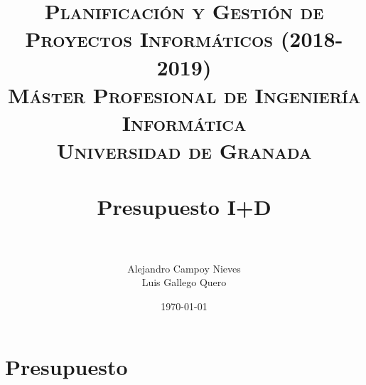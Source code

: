


\title{	
	\normalfont \normalsize 
	\textsc{\textbf{Planificación y Gestión de Proyectos Informáticos (2018-2019)} \\ Máster Profesional de Ingeniería Informática \\ Universidad de Granada} \\ [25pt] %
	\horrule{0.5pt} \\[0.4cm] %
	\huge Presupuesto I+D \\ %
	\horrule{2pt} \\[0.5cm] %
}

\author{Alejandro Campoy Nieves \\ Luis Gallego Quero} %
\date{\normalsize\today} %

\usepackage[spanish, es-tabla]{babel}
\usepackage{hyperref} %
\hypersetup{
	colorlinks=true,
	linkcolor=blue,
	filecolor=magenta,      
	urlcolor=cyan,
}
\usepackage{graphicx}
\usepackage{amssymb, amsmath, amsbsy}
\usepackage{mathptmx}	
\usepackage{float}
\usepackage{booktabs}					%
\usepackage{eurosym}
\usepackage{xcolor}
\usepackage{colortbl}




	\maketitle %
	
	\newpage %
	
	\tableofcontents %
	
	
	\listoftables	
	
	\newpage			

\section{Presupuesto}
 
